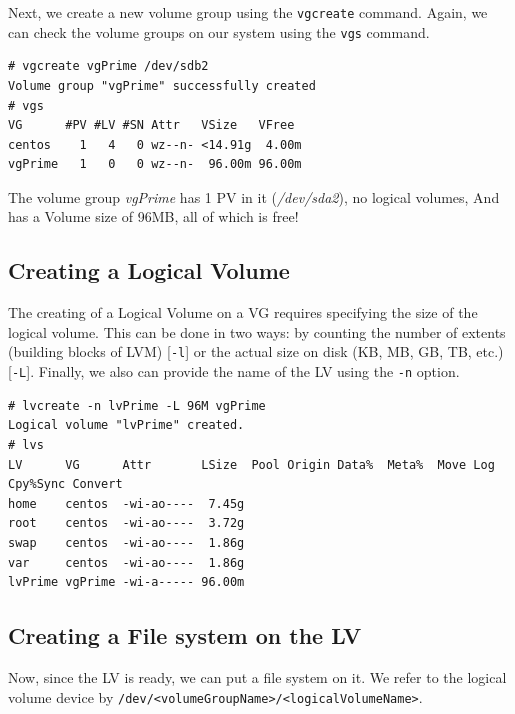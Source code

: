 Next, we create a new volume group using the \verb|vgcreate| command. Again, we can check the volume groups on our system using the \verb|vgs| command. 

\vspace{-15pt}
\begin{verbatim}
# vgcreate vgPrime /dev/sdb2
Volume group "vgPrime" successfully created
# vgs
VG      #PV #LV #SN Attr   VSize   VFree 
centos    1   4   0 wz--n- <14.91g  4.00m
vgPrime   1   0   0 wz--n-  96.00m 96.00m
\end{verbatim}
\vspace{-10pt}

\noindent
The volume group \textit{vgPrime} has 1 PV in it (\textit{/dev/sda2}), no logical volumes, And has a Volume size of 96MB, all of which is free!

\subsection{Creating a Logical Volume}
The creating of a Logical Volume on a VG requires specifying the size of the logical volume. This can be done in two ways: by counting the number of extents (building blocks of LVM) [\verb|-l|] or the actual size on disk (KB, MB, GB, TB, etc.)[\verb|-L|]. Finally, we also can provide the name of the LV using the \verb|-n| option. 

\vspace{-15pt}
\begin{verbatim}
# lvcreate -n lvPrime -L 96M vgPrime
Logical volume "lvPrime" created.
# lvs
LV      VG      Attr       LSize  Pool Origin Data%  Meta%  Move Log Cpy%Sync Convert
home    centos  -wi-ao----  7.45g                                                    
root    centos  -wi-ao----  3.72g                                                    
swap    centos  -wi-ao----  1.86g                                                    
var     centos  -wi-ao----  1.86g                                                    
lvPrime vgPrime -wi-a----- 96.00m                
\end{verbatim}
\vspace{-10pt}

\subsection{Creating a File system on the LV}
Now, since the LV is ready, we can put a file system on it. We refer to the logical volume device by \verb|/dev/<volumeGroupName>/<logicalVolumeName>|.

